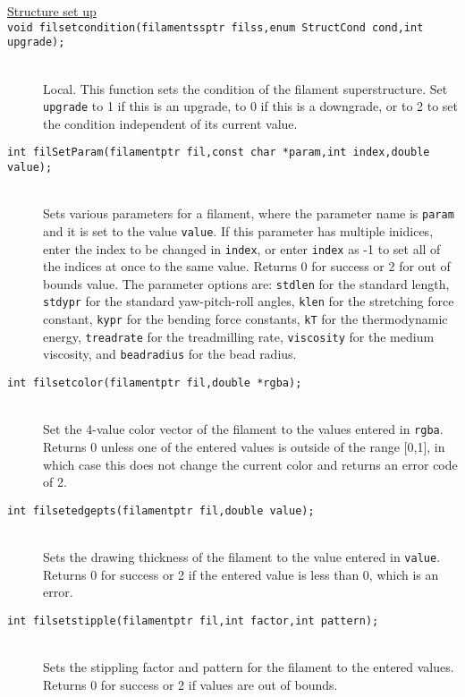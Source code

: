 \documentclass {book}
\newcommand {\ttt} {\texttt}
\begin{document}
\begin{description}
\item[\underline{Structure set up}]

\item[\ttt{void filsetcondition(filamentssptr filss,enum StructCond cond,int upgrade);}]
\hfill \\
Local. This function sets the condition of the filament superstructure. Set \ttt{upgrade} to 1 if this is an upgrade, to 0 if this is a downgrade, or to 2 to set the condition independent of its current value.

\item[\ttt{int filSetParam(filamentptr fil,const char *param,int index,double value);}]
\hfill \\
Sets various parameters for a filament, where the parameter name is \ttt{param} and it is set to the value \ttt{value}. If this parameter has multiple inidices, enter the index to be changed in \ttt{index}, or enter \ttt{index} as -1 to set all of the indices at once to the same value. Returns 0 for success or 2 for out of bounds value. The parameter options are: \ttt{stdlen} for the standard length, \ttt{stdypr} for the standard yaw-pitch-roll angles, \ttt{klen} for the stretching force constant, \ttt{kypr} for the bending force constants, \ttt{kT} for the thermodynamic energy, \ttt{treadrate} for the treadmilling rate, \ttt{viscosity} for the medium viscosity, and \ttt{beadradius} for the bead radius.

\item[\ttt{int filsetcolor(filamentptr fil,double *rgba);}]
\hfill \\
Set the 4-value color vector of the filament to the values entered in \ttt{rgba}. Returns 0 unless one of the entered values is outside of the range [0,1], in which case this does not change the current color and returns an error code of 2.

\item[\ttt{int filsetedgepts(filamentptr fil,double value);}]
\hfill \\
Sets the drawing thickness of the filament to the value entered in \ttt{value}. Returns 0 for success or 2 if the entered value is less than 0, which is an error.

\item[\ttt{int filsetstipple(filamentptr fil,int factor,int pattern);}]
\hfill \\
Sets the stippling factor and pattern for the filament to the entered values. Returns 0 for success or 2 if values are out of bounds.


\end{description}
\end{document}
